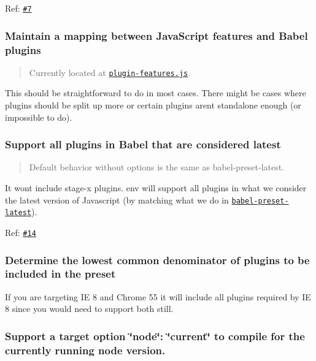 Ref\+: \href{https://github.com/babel/babel-preset-env/issues/7}{\tt \#7}

\subsubsection*{Maintain a mapping between Java\+Script features and Babel plugins}

\begin{quote}
Currently located at \href{https://github.com/babel/babel-preset-env/blob/master/data/plugin-features.js}{\tt plugin-\/features.\+js}. \end{quote}


This should be straightforward to do in most cases. There might be cases where plugins should be split up more or certain plugins aren\textquotesingle{}t standalone enough (or impossible to do).

\subsubsection*{Support all plugins in Babel that are considered {\ttfamily latest}}

\begin{quote}
Default behavior without options is the same as {\ttfamily babel-\/preset-\/latest}. \end{quote}


It won\textquotesingle{}t include {\ttfamily stage-\/x} plugins. env will support all plugins in what we consider the latest version of Javascript (by matching what we do in \href{http://babeljs.io/docs/plugins/preset-latest/}{\tt {\ttfamily babel-\/preset-\/latest}}).

Ref\+: \href{https://github.com/babel/babel-preset-env/issues/14}{\tt \#14}

\subsubsection*{Determine the lowest common denominator of plugins to be included in the preset}

If you are targeting IE 8 and Chrome 55 it will include all plugins required by IE 8 since you would need to support both still.

\subsubsection*{Support a target option {\ttfamily \char`\"{}node\char`\"{}\+: \char`\"{}current\char`\"{}} to compile for the currently running node version.}

